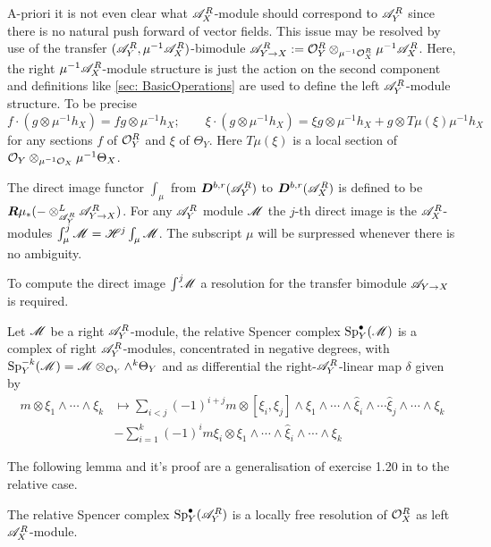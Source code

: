     A-priori it is not even clear what $\mathscr{A}_X^R$-module should correspond to $\mathscr{A}_Y^R$ since there is no natural push forward of vector fields.
    This issue may be resolved by use of the transfer $(\mathscr{A}_Y^R,\mu^{-1}\mathscr{A}_X^R)$-bimodule $\mathscr{A}_{Y\to X}^R:= \mathcal{O}_Y^R \otimes_{\mu^{-1}\mathcal{O}_X^R}\mu^{-1}\mathscr{A}_X^R$.
    Here, the right $\mu^{-1}\mathscr{A}_X^R$-module structure is just the action on the second component and definitions like \cref{sec: BasicOperations} are used to define the left $\mathscr{A}_Y^R$-module structure. To be precise
    $$f\cdot (g\otimes \mu^{-1}h_X) = fg \otimes \mu^{-1}h_X; \qquad \xi\cdot (g\otimes\mu^{-1}h_X) = \xi g \otimes \mu^{-1}h_X + g \otimes T\mu(\xi)\mu^{-1}h_X $$
    for any sections $f$ of $\mathcal{O}_Y^R$ and $\xi$ of $\Theta_Y$. Here $T\mu(\xi)$ is a local section of $\mathcal{O}_Y\otimes_{\mu^{-1}\mathcal{O}_X} \mu^{-1}\Theta_X$.
    \begin{definition}
      The direct image functor $\int_\mu$ from $\boldsymbol{D}^{b,r}(\mathscr{A}_Y^R)$ to $\boldsymbol{D}^{b,r}(\mathscr{A}_X^R)$ is defined to be $\boldsymbol{R}\mu_* ({-}\otimes_{\mathscr{A}_Y^R}^L \mathscr{A}_{Y\to X}^R)$.
      For any $\mathscr{A}_Y^R$ module $\mathscr{M}$ the $j$-th direct image is the $\mathscr{A}_X^R$-modules $\int_\mu^j \mathscr{M} = \mathscr{H}^j \int_\mu \mathscr{M}$.
      The subscript $\mu$ will be surpressed whenever there is no ambiguity.
    \end{definition}
    To compute the direct image $\int^j \mkern -8mu \mathscr{M}$ a resolution for the transfer bimodule $\mathscr{A}_{Y\to X}$ is required.
    \begin{definition}
        Let $\mathscr{M}$ be a right $\mathscr{A}_Y^R$-module, the relative Spencer complex $\operatorname{Sp}_Y^\bullet(\mathscr{M})$ is a complex of right $\mathscr{A}_Y^R$-modules, concentrated in negative degrees, with $\operatorname{Sp}_Y^{-k}(\mathscr{M}) = \mathscr{M} \otimes_{\mathcal{O}_Y} \wedge^{k}\Theta_Y$ and as differential the right-$\mathscr{A}_Y^R$-linear map $\delta$ given by
        \begin{align*}
            m\otimes \xi_1 \wedge \cdots \wedge \xi_k &\mapsto \sum_{i<j}(-1)^{i+j} m \otimes [\xi_i,\xi_j]\wedge \xi_1 \wedge \cdots \wedge \widehat{\xi}_i \wedge\cdots \widehat{\xi}_j \wedge \cdots \wedge \xi_k\\
            &- \sum_{i=1}^k (-1)^{i} m\xi_i \otimes \xi_1 \wedge \cdots \wedge \widehat{\xi}_i\wedge \cdots \wedge \xi_k
        \end{align*}
    \end{definition}
    The following lemma and it's proof are a generalisation of exercise 1.20 in \cite{sabbah2011introduction} to the relative case.
    \begin{lemma}\label{lem: RelativeSpencerResolvesOXR}
      The relative Spencer complex $\operatorname{Sp}_Y^\bullet(\mathscr{A}_Y^R)$ is a locally free resolution of $\mathcal{O}_X^R$ as left $\mathscr{A}_X^R$-module.
    \end{lemma}
